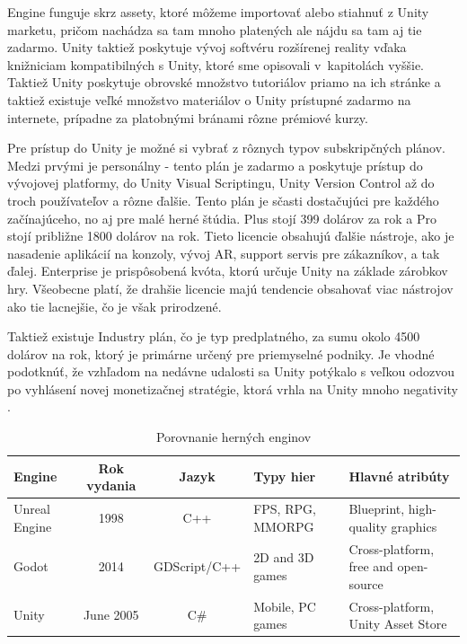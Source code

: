 Engine funguje skrz assety, ktoré môžeme importovať alebo stiahnuť z Unity marketu, pričom nachádza sa tam mnoho platených ale nájdu sa tam aj tie zadarmo. Unity taktiež poskytuje vývoj softvéru rozšírenej reality vďaka knižniciam kompatibilných s Unity, ktoré sme opisovali v~kapitolách vyššie. Taktiež Unity poskytuje obrovské množstvo tutoriálov priamo na ich stránke a taktiež existuje veľké množstvo materiálov o Unity prístupné zadarmo na internete, prípadne za platobnými bránami rôzne prémiové kurzy.

Pre prístup do Unity je možné si vybrať z rôznych typov subskripčných plánov. Medzi prvými je personálny - tento plán je zadarmo a poskytuje prístup do vývojovej platformy, do Unity Visual Scriptingu, Unity Version Control až do troch používateľov a rôzne ďalšie. Tento plán je sčasti dostačujúci pre každého začínajúceho, no aj pre malé herné štúdia. Plus stojí 399 dolárov za rok a Pro stojí približne 1800 dolárov na rok. Tieto licencie obsahujú ďalšie nástroje, ako je nasadenie aplikácií na konzoly, vývoj AR, support servis pre zákazníkov, a tak ďalej. Enterprise je prispôsobená kvóta, ktorú určuje Unity na základe zárobkov hry.  Všeobecne platí, že drahšie licencie majú tendencie obsahovať viac nástrojov ako tie lacnejšie, čo je však prirodzené. 

Taktiež existuje Industry plán, čo je typ predplatného, za sumu okolo 4500 dolárov na rok, ktorý je primárne určený pre priemyselné podniky. Je vhodné podotknúť, že vzhľadom na nedávne udalosti sa Unity potýkalo s veľkou odozvou po vyhlásení novej monetizačnej stratégie, ktorá vrhla na Unity mnoho negativity \cite{lacoma2023unity}.%

\begin{table}[!h]
\centering
\caption{Porovnanie herných enginov}
\label{tab:game-engines}
\begin{tabularx}{\textwidth}{|l|c|c|X|X|}
\hline
\textbf{Engine} & \textbf{Rok vydania} & \textbf{Jazyk} & \textbf{Typy hier} & \textbf{Hlavné atribúty} \\ \hline
Unreal Engine & 1998 & C++ & FPS, RPG, MMORPG & Blueprint, high-quality graphics \\ \hline
Godot & 2014 & GDScript/C++ & 2D and 3D games & Cross-platform, free and open-source \\ \hline
Unity & June 2005 & C\# & Mobile, PC games & Cross-platform, Unity Asset Store \\ \hline
\end{tabularx}
\end{table}

